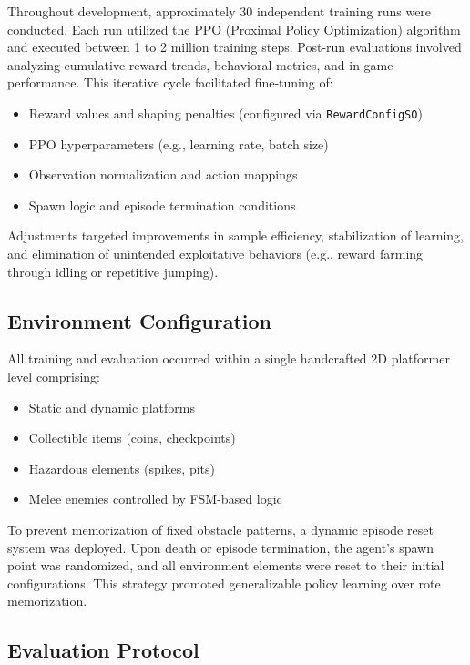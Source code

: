 \documentclass[12pt,oneside,openright,a4paper]{cpe-english-project}
\begin{document}
Throughout development, approximately 30 independent training runs were conducted. Each run utilized the PPO (Proximal Policy Optimization) algorithm and executed between 1 to 2 million training steps. Post-run evaluations involved analyzing cumulative reward trends, behavioral metrics, and in-game performance. This iterative cycle facilitated fine-tuning of:

\begin{itemize}
\item Reward values and shaping penalties (configured via \texttt{RewardConfigSO})
\item PPO hyperparameters (e.g., learning rate, batch size)
\item Observation normalization and action mappings
\item Spawn logic and episode termination conditions
\end{itemize}

Adjustments targeted improvements in sample efficiency, stabilization of learning, and elimination of unintended exploitative behaviors (e.g., reward farming through idling or repetitive jumping).

\subsection{Environment Configuration}

All training and evaluation occurred within a single handcrafted 2D platformer level comprising:

\begin{itemize}
\item Static and dynamic platforms
\item Collectible items (coins, checkpoints)
\item Hazardous elements (spikes, pits)
\item Melee enemies controlled by FSM-based logic
\end{itemize}

To prevent memorization of fixed obstacle patterns, a dynamic episode reset system was deployed. Upon death or episode termination, the agent's spawn point was randomized, and all environment elements were reset to their initial configurations. This strategy promoted generalizable policy learning over rote memorization.

\subsection{Evaluation Protocol}
\end{document}
